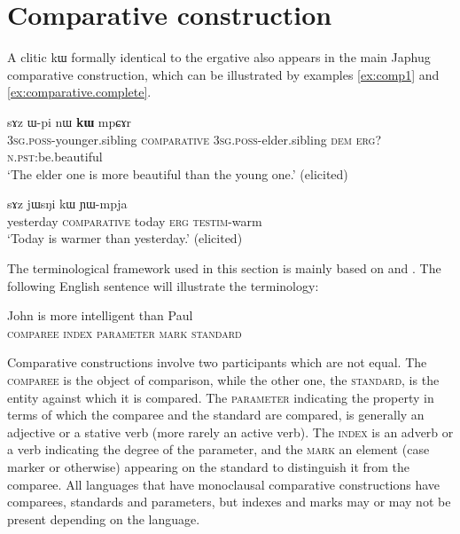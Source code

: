\documentclass[oldfontcommands,oneside,a4paper,11pt]{article}
\newcommand{\ipa}[1]{{\phon #1}} %
\begin{document}
 

\section{Comparative construction} \label{sec:comparative}

A clitic \ipa{kɯ} formally identical to the ergative also appears in the main Japhug comparative construction, which can be illustrated by   examples \ref{ex:comp1} and \ref{ex:comparative.complete}.

\begin{exe}
\ex \label{ex:comp1}
\gll  \ipa{ɯ-ʁi}   	\ipa{sɤz}   	\ipa{ɯ-pi}   	\ipa{nɯ}   	\ipa{\textbf{kɯ}}   	\ipa{mpɕɤr}     \\
\textsc{3sg.poss}-younger.sibling \textsc{comparative} \textsc{3sg.poss}-elder.sibling \textsc{dem} \textsc{erg?}  \textsc{n.pst:}be.beautiful \\
\glt `The elder one is more beautiful than the young one.' (elicited)
\end{exe}
 
 
\begin{exe}
\ex \label{ex:comparative.complete}
\gll \ipa{jɯfɕɯr}   	\ipa{sɤz }   	\ipa{jɯsŋi}   	\ipa{kɯ}   	\ipa{ɲɯ-mpja}   \\
yesterday \textsc{comparative} today \textsc{erg} \textsc{testim}-warm \\
\glt `Today is warmer than yesterday.' (elicited)
\end{exe}

The terminological framework used in this section is mainly based on \citet{dixon08comparative} and \citet{stassen11comparative}. The following English sentence will illustrate the  terminology:

\begin{exe}
\ex \label{ex:comp.eng}
\gll  John is more intelligent than Paul \\
\textsc{comparee} { } \textsc{index} \textsc{parameter} \textsc{mark} \textsc{standard}  \\
\end{exe}

Comparative constructions involve two participants which are not equal. The \textsc{comparee} is  the object of comparison, while the other one, the \textsc{standard}, is the entity against which it is compared. The \textsc{parameter} indicating the property in terms of which the comparee and the standard are compared, is generally an adjective or a stative verb (more rarely an active verb). The \textsc{index} is an adverb or a verb indicating the degree of the parameter, and the \textsc{mark} an element (case marker or otherwise) appearing on the standard to distinguish it from the comparee. All languages that have monoclausal comparative constructions have comparees, standards and parameters, but indexes and marks may or may not be present depending on the language.
\end{document}
